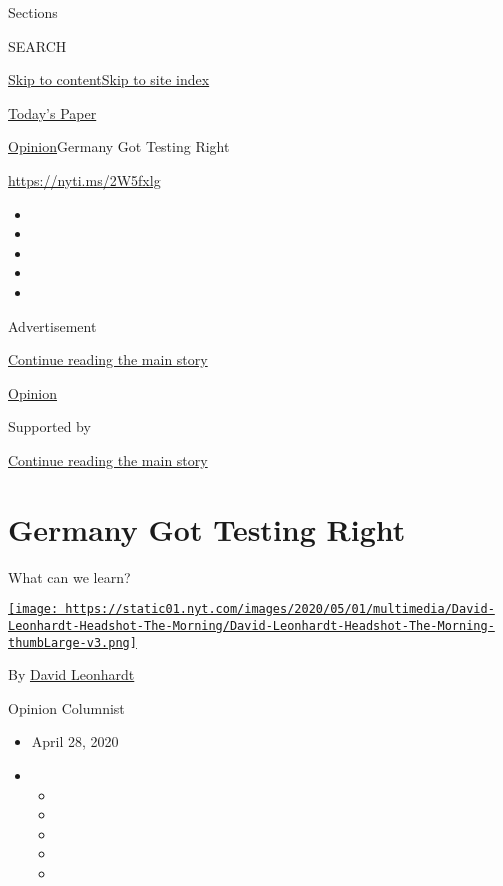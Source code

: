 Sections

SEARCH

\protect\hyperlink{site-content}{Skip to
content}\protect\hyperlink{site-index}{Skip to site index}

\href{https://myaccount.nytimes.com/auth/login?response_type=cookie\&client_id=vi}{}

\href{https://www.nytimes.com/section/todayspaper}{Today's Paper}

\href{/section/opinion}{Opinion}\textbar{}Germany Got Testing Right

\href{https://nyti.ms/2W5fxlg}{https://nyti.ms/2W5fxlg}

\begin{itemize}
\item
\item
\item
\item
\item
\end{itemize}

Advertisement

\protect\hyperlink{after-top}{Continue reading the main story}

\href{/section/opinion}{Opinion}

Supported by

\protect\hyperlink{after-sponsor}{Continue reading the main story}

\hypertarget{germany-got-testing-right}{%
\section{Germany Got Testing Right}\label{germany-got-testing-right}}

What can we learn?

\href{https://www.nytimes.com/by/david-leonhardt}{\texttt{[image: https://static01.nyt.com/images/2020/05/01/multimedia/David-Leonhardt-Headshot-The-Morning/David-Leonhardt-Headshot-The-Morning-thumbLarge-v3.png]}}

By \href{https://www.nytimes.com/by/david-leonhardt}{David Leonhardt}

Opinion Columnist

\begin{itemize}
\item
  April 28, 2020
\item
  \begin{itemize}
  \item
  \item
  \item
  \item
  \item
  \end{itemize}
\end{itemize}

